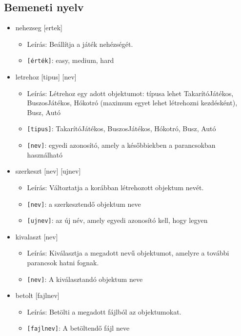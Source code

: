 \subsection{Bemeneti nyelv}
\begin{itemize}
    \item nehezseg [ertek]
    \begin{itemize}
        \item Leírás: Beállítja a játék nehézségét.
        \item \texttt{[érték]}: easy, medium, hard
    \end{itemize}

    \item letrehoz [tipus] [nev]
    \begin{itemize}
        \item Leírás: Létrehoz egy adott objektumot: típusa lehet TakarítóJátékos, BuszosJátékos, Hókotró (maximum egyet lehet létrehozni kezdésként), Busz, Autó
        \item \texttt{[tipus]}: TakarítóJátékos, BuszosJátékos, Hókotró, Busz, Autó
        \item \texttt{[nev]}: egyedi azonosító, amely a későbbiekben a parancsokban használható
    \end{itemize}

    \item szerkeszt [nev] [ujnev] 
    \begin{itemize}
        \item Leírás: Változtatja a korábban létrehozott objektum nevét.
        \item \texttt{[nev]}: a szerkesztendő objektum neve
        \item \texttt{[ujnev]}: az új név, amely egyedi azonosító kell, hogy legyen
    \end{itemize}

    \item kivalaszt [nev]
    \begin{itemize}
        \item Leírás: Kiválasztja a megadott nevű objektumot, amelyre a további parancsok hatni fognak.
        \item \texttt{[nev]}: A kiválasztandó objektum neve
    \end{itemize}

    \item betolt [fajlnev]
    \begin{itemize}
        \item Leírás: Betölti a megadott fájlból az objektumokat.
        \item \texttt{[fajlnev]}: A betöltendő fájl neve
    \end{itemize}


\end{itemize}
